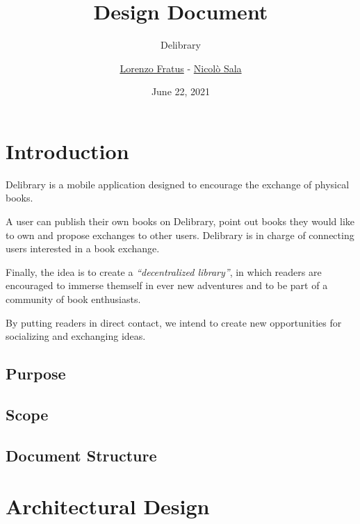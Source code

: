 
\graphicspath{ {assets/} }

\title{Design Document}
\subtitle{Delibrary}
\author{\href{https://github.com/lorenzofratus}{Lorenzo Fratus} - \href{https://github.com/nicheosala}{Nicolò Sala}}
\date{June 22, 2021}



\maketitle

\tableofcontents



\chapter{Introduction}

Delibrary is a mobile application designed to encourage the exchange of physical books.

A user can publish their own books on Delibrary, point out books they would like to own and propose exchanges to other users.
Delibrary is in charge of connecting users interested in a book exchange.

Finally, the idea is to create a \emph{``decentralized library''}, in which readers are encouraged to immerse themself 
in ever new adventures and to be part of a community of book enthusiasts.

By putting readers in direct contact, we intend to create new opportunities for socializing and exchanging ideas.

\section{Purpose}

\section{Scope}

\section{Document Structure}



\chapter{Architectural Design}

